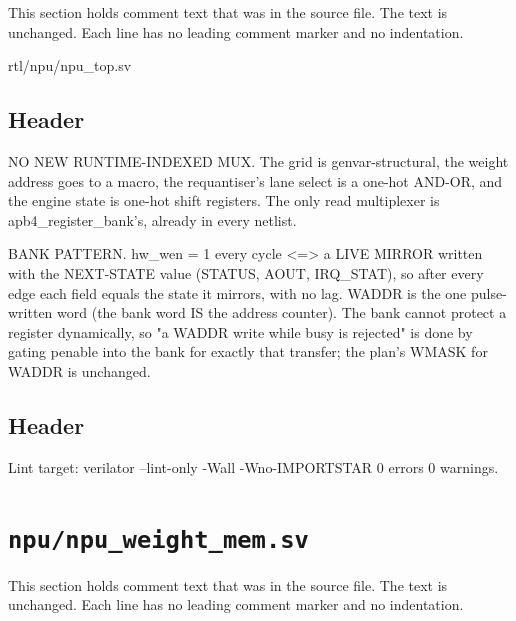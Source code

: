 This section holds comment text that was in the source file. The text is unchanged. Each line has no leading comment marker and no indentation.

\begin{relocated}{rtl/npu/npu_top.sv}

\subsection*{Header}

\begin{textblock}
NO NEW RUNTIME-INDEXED MUX. The grid is genvar-structural, the weight address goes to a macro,
the requantiser's lane select is a one-hot AND-OR, and the engine state is one-hot shift
registers. The only read multiplexer is apb4_register_bank's, already in every netlist.

BANK PATTERN. hw_wen = 1 every cycle <=> a LIVE MIRROR written with the NEXT-STATE value
(STATUS, AOUT, IRQ_STAT), so after every edge each field equals the state it mirrors, with no
lag. WADDR is the one pulse-written word (the bank word IS the address counter). The bank cannot
protect a register dynamically, so "a WADDR write while busy is rejected" is done by gating
penable into the bank for exactly that transfer; the plan's WMASK for WADDR is unchanged.
\end{textblock}

\subsection*{Header}

\begin{textblock}
Lint target: verilator --lint-only -Wall -Wno-IMPORTSTAR 0 errors 0 warnings.
\end{textblock}

\end{relocated}

\section{\texttt{npu/npu\_weight\_mem.sv}}\label{tm:mod:npu-weight-mem}

This section holds comment text that was in the source file. The text is unchanged. Each line has no leading comment marker and no indentation.

